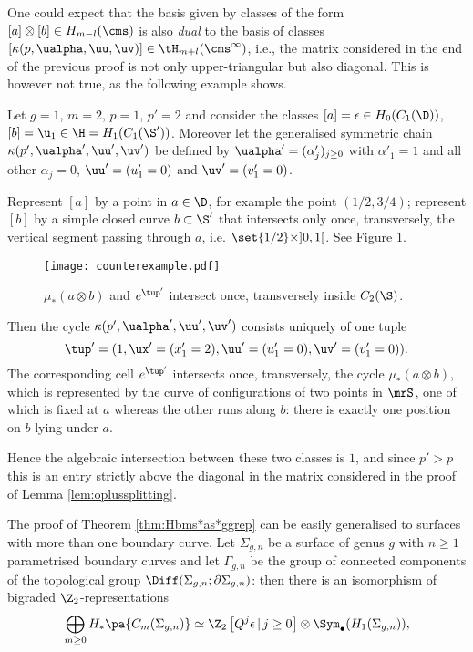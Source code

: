 One could expect that the basis given by classes of the form $[a]\otimes [b]\in H_{m-l}(\cms)$
is also \emph{dual} to the basis of classes $[\kappa(p,\ualpha,\uu,\uv)]\in \tH_{m+l}(\cms^{\infty})$, i.e., the
matrix considered in the end of the previous proof is not only upper-triangular but also
diagonal. This is however not true, as the following example shows.

Let $g=1$, $m=2$, $p=1$, $p'=2$ and consider the classes $[a]=\epsilon\in H_0(C_1(\D))$,
$[b]=\u_1\in \H=H_1(C_1(\S'))$. Moreover let the generalised symmetric chain
$\kappa(p',\ualpha',\uu',\uv')$ be defined by
$\ualpha'=(\alpha'_j)_{j\geq 0}$ with $\alpha'_1=1$ and all other $\alpha_j=0$, $\uu'=(u'_1=0)$
and $\uv'=(v'_1=0)$.

Represent $[a]$ by a point in $a\in\D$, for example
the point $(1/2,3/4)$; represent $[b]$ by a simple closed curve $b\subset\S'$
that intersects only once, transversely, the vertical segment passing through $a$, i.e.
$\set{1/2}\times]0,1[$. See Figure \ref{fig:counterexample}.

\begin{figure}\centering
 \texttt{[image: counterexample.pdf]}
 \caption{$\mu_*(a\otimes b)$ and $e^{\tup'}$ intersect once, transversely inside $C_2(\S)$.}
\label{fig:counterexample}
\end{figure}

Then the cycle $\kappa(p',\ualpha',\uu',\uv')$ consists uniquely of one tuple
\[
\tup'=(1,\ux'=(x'_1=2),\uu'=(u'_1=0),\uv'=(v'_1=0)).
\]
The corresponding cell $e^{\tup'}$ intersects once, transversely,
the cycle $\mu_*(a\otimes b)$, which is represented by the curve of configurations of two
points in $\mrS$, one of which is fixed at $a$ whereas the other runs along $b$:
there is exactly one position on $b$ lying under $a$.

Hence the algebraic intersection between these two classes is $1$, and since $p'>p$
this is an entry strictly above the diagonal in the matrix considered in the proof
of Lemma \ref{lem:oplussplitting}.

The proof of Theorem \ref{thm:Hbms*as*ggrep} can be easily generalised to surfaces
with more than one boundary curve. Let $\Sigma_{g,n}$ be a surface of genus
$g$ with $n\geq 1$ parametrised boundary curves and let $\Gamma_{g,n}$ be
the group of connected components of the topological group
$\Diff(\Sigma_{g,n};\partial\Sigma_{g,n})$:
then there is an isomorphism of bigraded $\Z_2$-representations
\begin{equation}
\label{eq:sgn}
\bigoplus_{m\geq 0}H_*\pa{C_m(\Sigma_{g,n})}\simeq \Z_2\left[Q^j\epsilon\,|\, j\geq 0\right]\otimes\Sym_{\bullet}(H_1(\Sigma_{g,n})),
\end{equation}

